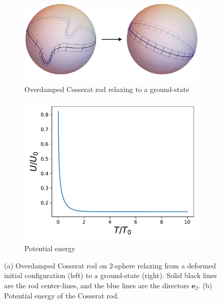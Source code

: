 \begin{figure} 
    \centering
     
    \begin{subfigure}[b]{0.6\textwidth}  
        \centering 
        \includegraphics[width=\textwidth]{figs_part2/cosserat_rod_on_spheres/rod_on_sphere.pdf}
        \caption[Overdamped Cosserat rod relaxing to a ground-state]%
        {{\small Overdamped Cosserat rod relaxing to a ground-state}}    
        \label{fig:rod on sphere simulation}
    \end{subfigure}
    \hfill
    \begin{subfigure}[b]{0.32\textwidth}
        \centering
        \includegraphics[width=\textwidth]{figs_part2/cosserat_rod_on_spheres/rod_on_sphere_U.pdf}
        \caption[Potential energy]%
        {{\small Potential energy}}    
        \label{fig:rod on sphere U}
    \end{subfigure}    
    
    \caption[  ]
    {\small (a) Overdamped Cosserat rod on $2$-sphere relaxing from a deformed initial configuration (left) to a ground-state (right). Solid black lines are the rod center-lines, and the blue lines are the directors $\mathbf{e}_2$. (b) Potential energy of the Cosserat rod.} 
    \label{fig:rod on sphere}
\end{figure}

